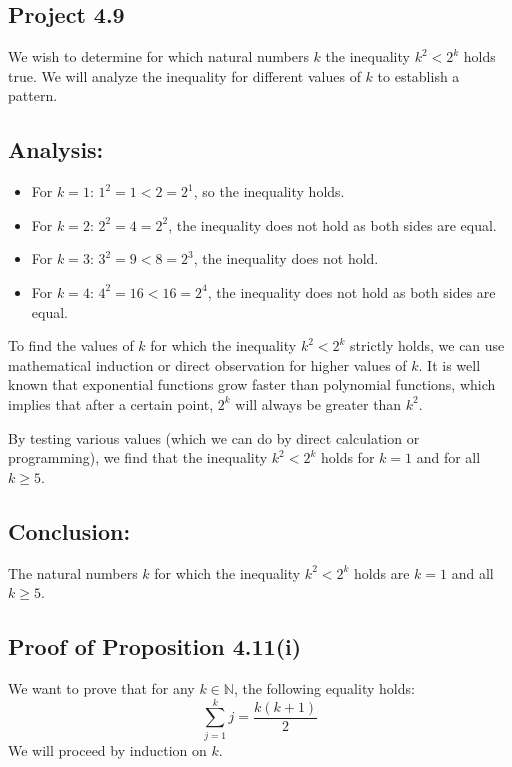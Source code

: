 \documentclass[12pt]{article}
\begin{document}
\subsection*{Project 4.9}

We wish to determine for which natural numbers \( k \) the inequality \( k^2 < 2^k \) holds true. We will analyze the inequality for different values of \( k \) to establish a pattern.

\subsection*{Analysis:}
\begin{itemize}
  \item For \( k = 1 \): \( 1^2 = 1 < 2 = 2^1 \), so the inequality holds.
  \item For \( k = 2 \): \( 2^2 = 4 = 2^2 \), the inequality does not hold as both sides are equal.
  \item For \( k = 3 \): \( 3^2 = 9 < 8 = 2^3 \), the inequality does not hold.
  \item For \( k = 4 \): \( 4^2 = 16 < 16 = 2^4 \), the inequality does not hold as both sides are equal.
\end{itemize}

To find the values of \( k \) for which the inequality \( k^2 < 2^k \) strictly holds, we can use mathematical induction or direct observation for higher values of \( k \). It is well known that exponential functions grow faster than polynomial functions, which implies that after a certain point, \( 2^k \) will always be greater than \( k^2 \).

By testing various values (which we can do by direct calculation or programming), we find that the inequality \( k^2 < 2^k \) holds for \( k = 1 \) and for all \( k \geq 5 \).

\subsection*{Conclusion:}
The natural numbers \( k \) for which the inequality \( k^2 < 2^k \) holds are \( k = 1 \) and all \( k \geq 5 \).


\subsection*{Proof of Proposition 4.11(i)}

We want to prove that for any \( k \in \mathbb{N} \), the following equality holds:
\[ \sum_{j=1}^{k} j = \frac{k(k+1)}{2} \]
We will proceed by induction on \( k \).
\end{document}

